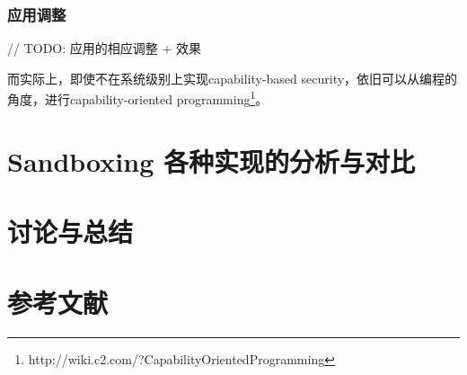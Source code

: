 \documentclass[final,12pt]{elsarticle}
\begin{document}
\subsubsection{应用调整}
\label{sss:adoption}

// TODO: 应用的相应调整 + 效果

而实际上，即使不在系统级别上实现capability-based security，依旧可以从编程的角度，进行capability-oriented programming\footnote{http://wiki.c2.com/?CapabilityOrientedProgramming}。

\section{Sandboxing 各种实现的分析与对比}
\label{s:evaluation}

\section{讨论与总结}
\label{s:tucao}






\clearpage

\section*{参考文献}

 

\end{document}
